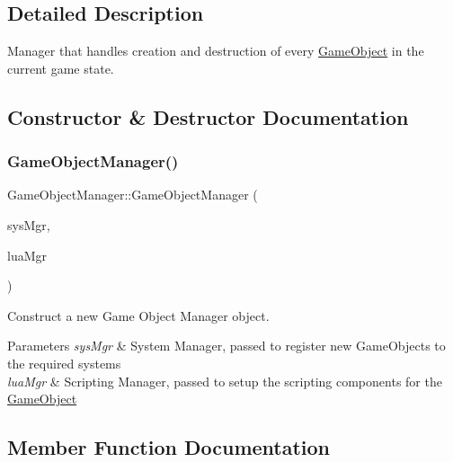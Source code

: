 \subsection{Detailed Description}
Manager that handles creation and destruction of every \hyperlink{classGameObject}{Game\+Object} in the current game state. 

\subsection{Constructor \& Destructor Documentation}
\mbox{\label{classGameObjectManager_af092ff9e97731c99cb0d4f258d7d4949}} 
\subsubsection{\texorpdfstring{Game\+Object\+Manager()}{GameObjectManager()}}
{\footnotesize\ttfamily Game\+Object\+Manager\+::\+Game\+Object\+Manager (\begin{DoxyParamCaption}\item[{\hyperlink{classSystemManager}{System\+Manager} $\ast$}]{sys\+Mgr,  }\item[{\hyperlink{classScriptingManager}{Scripting\+Manager} $\ast$}]{lua\+Mgr }\end{DoxyParamCaption})}



Construct a new Game Object Manager object. 


\begin{DoxyParams}{Parameters}
{\em sys\+Mgr} & System Manager, passed to register new Game\+Objects to the required systems \\
\hline
{\em lua\+Mgr} & Scripting Manager, passed to setup the scripting components for the \hyperlink{classGameObject}{Game\+Object} \\
\hline
\end{DoxyParams}


\subsection{Member Function Documentation}
\mbox{\label{classGameObjectManager_a8520515811ae62ac9c1a086ae2a886f3}} 
